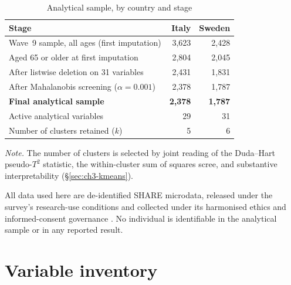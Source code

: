 \begin{table}[!ht]
  \centering
  \caption[Analytical sample by country and stage]{Analytical sample, by country and stage}
  \label{tab:ch3-sample-sizes}
  \begin{tabular}{lrr}
    \toprule
    \textbf{Stage} & \textbf{Italy} & \textbf{Sweden} \\
    \midrule
    Wave~9 sample, all ages (first imputation) & 3{,}623 & 2{,}428 \\
    Aged 65 or older at first imputation & 2{,}804 & 2{,}045 \\
    After listwise deletion on 31 variables & 2{,}431 & 1{,}831 \\
    After Mahalanobis screening ($\alpha = 0.001$) & 2{,}378 & 1{,}787 \\
    \textbf{Final analytical sample} & \textbf{2{,}378} & \textbf{1{,}787} \\
    Active analytical variables & 29 & 31 \\
    Number of clusters retained ($k$) & 5 & 6 \\
    \bottomrule
  \end{tabular}
  \par\medskip
  \begin{minipage}{\linewidth}
    \footnotesize\textit{Note.} The number of clusters is selected by joint reading of the Duda--Hart pseudo-$T^2$ statistic, the within-cluster sum of squares scree, and substantive interpretability (\S\ref{sec:ch3-kmeans}).
  \end{minipage}
\end{table}

All data used here are de-identified SHARE microdata, released under the survey's research-use conditions and collected under its harmonised ethics and informed-consent governance \citep{borschsupan2013}. No individual is identifiable in the analytical sample or in any reported result.

\section{Variable inventory}
\label{sec:ch3-variables}


